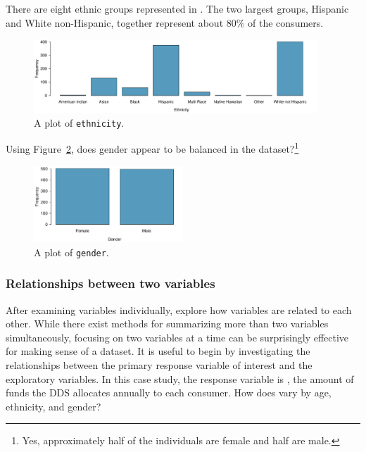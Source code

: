 There are eight ethnic groups represented in . The two largest groups, Hispanic and White non-Hispanic, together represent about 80\% of the consumers.

\begin{figure}[h]
	\centering
	\includegraphics[width=0.95\textwidth]{ch_intro_to_data_oi_biostat/figures/ddsEthnicityPlot/ddsEthnicityPlot}
	\caption{A plot of \texttt{ethnicity}. }
	\label{ddsEthnicityPlot}
\end{figure}

\begin{exercise} Using Figure~\ref{ddsGenderPlot}, does gender appear to be balanced in the  dataset?\footnote{Yes, approximately half of the individuals are female and half are male.}

\begin{figure}[h]
	\centering
	\includegraphics[width=0.5\textwidth]{ch_intro_to_data_oi_biostat/figures/ddsGenderPlot/ddsGenderPlot}
	\caption{A plot of \texttt{gender}. }
	\label{ddsGenderPlot}
\end{figure}

\end{exercise}



\subsubsection{Relationships between two variables}

After examining variables individually, explore how variables are related to each other. While there exist methods for summarizing more than two variables simultaneously, focusing on two variables at a time can be surprisingly effective for making sense of a dataset. It is useful to begin by investigating the relationships between the primary response variable of interest and the exploratory variables. In this case study, the response variable is , the amount of funds the DDS allocates annually to each consumer. How does  vary by age, ethnicity, and gender?

